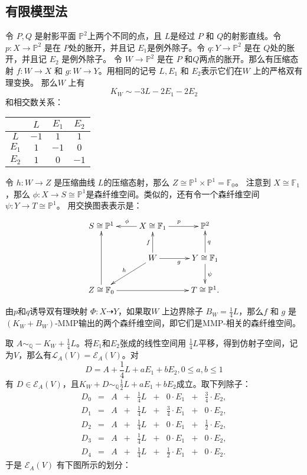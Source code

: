 \subsection{有限模型法}
令  $P,Q$ 是射影平面 $\mathbb{P}^{2}$上两个不同的点，且 $L$是经过 $P$ 和 $Q$的射影直线。令 $p:X\to \mathbb{P}^{2}$ 是在 $P$处的胀开，并且记 $E_{1}$是例外除子。令 $q:Y\to \mathbb{P}^{2}$ 是在 $Q$处的胀开，并且记 $E_{2}$ 是例外除子。 令 $W\to \mathbb{P}^{2}$ 是在  $P$ 和$Q$两点的胀开。那么有压缩态射 $f:W\to X$ 和 $g:W\to Y$。用相同的记号 $L,E_{1}$ 和 $E_{2}$表示它们在$W$ 上的严格双有理变换。 那么$W$ 上有
\[
  K_{W}\sim -3L-2E_{1}-2E_{2}
\]
和相交数关系： 
\begin{center}
  \begin{tabular}{cccc}
        \hline
                 & $L$  & $E_{1}$ & $E_{2}$ \\
        \hline
        $L$      & $-1$ & $1$     & $1$ \\
        $E_{1}$  & $1$  & $-1$    & $0$ \\
        $E_{2}$  & $1$  & $0$     & $-1$ \\
        \hline
    \end{tabular}
\end{center}
令  $h:W\to Z$ 是压缩曲线 $L$的压缩态射，那么 $Z\cong \mathbb{P}^{1} \times \mathbb{P}^{1}=\mathbb{F}_{0}$。 注意到 $X\cong \mathbb{F}_{1}$，那么 $\phi:X\to S \cong \mathbb{P}^{1}$是森纤维空间。类似的，还有令一个森纤维空间 $\psi: Y\to T\cong \mathbb{P}^{1}$。 用交换图表表示是：
\[ \xymatrix{
    S\cong \mathbb{P}^{1}&X\cong \mathbb{F}_{1}\ar[l]_{\phi}\ar[r]^{p} & \mathbb{P}^{2} \\
    &W\ar[u]^{f}\ar[r]_{g}\ar[ld]_{h} & Y\cong \mathbb{F}_{1}\ar[u]_{q}\ar[d]^{\psi}\\
    Z\cong \mathbb{F}_{0}\ar[uu]\ar[rr]&&T\cong \mathbb{P}^{1} .} \]

由$p$和$q$诱导双有理映射 $\Phi: X\dashrightarrow  Y$，如果取$W$ 上边界除子 $B_{W}=\frac{1}{4}L$，那么$f$ 和 $g$ 是 $(K_{W}+B_{W})$-MMP输出的两个森纤维空间，即它们是MMP-相关的森纤维空间。

取 $A\sim_{\mathbb{Q}}-K_{W}+\frac{1}{4}L$。将$E_{1}$和$E_{2}$张成的线性空间用  $\frac{1}{4}L$平移，得到仿射子空间，记为$V$，那么有$\mathcal{L}_{A}(V)=\mathcal{E}_{A}(V)$。对
\[ D=A+ \frac{1}{4}L +aE_{1}+bE_{2},0\leqslant a,b\leqslant 1 \]
有 $D \in \mathcal{E}_{A}(V)$，且$K_{W}+D\sim_{\mathbb{Q}} \frac{1}{2}L+aE_{1}+bE_{2}$成立。取下列除子：
\[ \begin{array}{rllllllll}
  D_{0}&=&A& +& \frac{1}{4}L& + &0\cdot E_{1}            &+& \frac{3}{4}\cdot E_{2}, \\
  D_{1}&=&A& +& \frac{1}{4}L& + & \frac{3}{4}\cdot E_{1} &+& 0 \cdot E_{2}, \\
  D_{2}&=&A& +& \frac{1}{4}L& + &0\cdot E_{1}            &+& \frac{1}{2}\cdot E_{2}, \\
  D_{3}&=&A& +& \frac{1}{4}L& + & 0\cdot  E_{1}          &+& 0 \cdot E_{2}, \\
  D_{4}&=&A& +& \frac{1}{4}L& + & \frac{1}{2}\cdot E_{1} &+& 0 \cdot E_{2}.
  \end{array} \]
于是 $\mathcal{E}_{A}(V)$ 有下图所示的划分：


